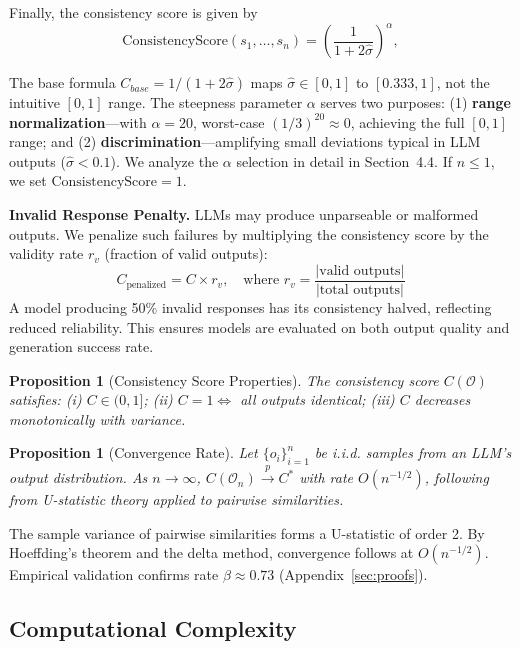 \documentclass{article}
\newtheorem{proposition}[theorem]{Proposition}
\begin{document}
Finally, the consistency score is given by
\vspace{-2mm}
\[
\text{ConsistencyScore}(s_1,\dots,s_n) = \left( \frac{1}{1 + 2\hat{\sigma}} \right)^{\alpha},
\]

The base formula $C_{base} = 1/(1 + 2\hat{\sigma})$ maps $\hat{\sigma} \in [0,1]$ to $[0.333, 1]$, not the intuitive $[0,1]$ range. The steepness parameter $\alpha$ serves two purposes: (1) \textbf{range normalization}---with $\alpha=20$, worst-case $(1/3)^{20} \approx 0$, achieving the full $[0,1]$ range; and (2) \textbf{discrimination}---amplifying small deviations typical in LLM outputs ($\hat{\sigma} < 0.1$). We analyze the $\alpha$ selection in detail in Section~4.4. If $n \leq 1$, we set $\text{ConsistencyScore} = 1$.

\textbf{Invalid Response Penalty.} LLMs may produce unparseable or malformed outputs. We penalize such failures by multiplying the consistency score by the validity rate $r_v$ (fraction of valid outputs):
\[
C_{\text{penalized}} = C \times r_v, \quad \text{where } r_v = \frac{|\text{valid outputs}|}{|\text{total outputs}|}
\]
A model producing 50\% invalid responses has its consistency halved, reflecting reduced reliability. This ensures models are evaluated on both output quality and generation success rate.

\begin{proposition}[Consistency Score Properties]
\label{prop:consistency}
The consistency score $C(\mathcal{O})$ satisfies: (i) $C \in (0, 1]$; (ii) $C = 1 \Leftrightarrow$ all outputs identical; (iii) $C$ decreases monotonically with variance.
\end{proposition}

\begin{proposition}[Convergence Rate]
\label{prop:convergence}
Let $\{o_i\}_{i=1}^n$ be i.i.d. samples from an LLM's output distribution. As $n \to \infty$, $C(\mathcal{O}_n) \xrightarrow{p} C^*$ with rate $O(n^{-1/2})$, following from U-statistic theory applied to pairwise similarities.
\end{proposition}
\vspace{-1mm}
\noindent The sample variance of pairwise similarities forms a U-statistic of order 2. By Hoeffding's theorem and the delta method, convergence follows at $O(n^{-1/2})$. Empirical validation confirms rate $\beta \approx 0.73$ (Appendix~\ref{sec:proofs}).

\subsection{Computational Complexity}
\end{document}
